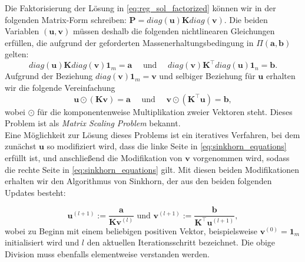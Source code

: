 \documentclass[twoside, 12pt,a4paper]{book}
\numberwithin{equation}{section}
\begin{document}
	\noindent Die Faktorisierung der Lösung in \eqref{eq:reg_sol_factorized} können wir in der folgenden Matrix-Form schreiben: $\boldsymbol{P} = diag(\boldsymbol{u}) \boldsymbol{K} diag(\boldsymbol{v})$. Die beiden Variablen $(\boldsymbol{u}, \boldsymbol{v})$ müssen deshalb die folgenden nichtlinearen Gleichungen erfüllen, die aufgrund der geforderten Massenerhaltungsbedingung in $\Pi (\boldsymbol{a},\boldsymbol{b})$ gelten:
		\begin{equation}
		diag(\boldsymbol{u}) \boldsymbol{K} diag(\boldsymbol{v})\boldsymbol{1}_m = \boldsymbol{a} \quad\text{ und } \quad
		diag(\boldsymbol{v}) \boldsymbol{K}^\top diag(\boldsymbol{u})\boldsymbol{1}_n = \boldsymbol{b}.
		\end{equation}
		Aufgrund der Beziehung $diag(\boldsymbol{v})\boldsymbol{1}_m =  \boldsymbol{v}$ und selbiger Beziehung für $\boldsymbol{u}$ erhalten wir die folgende Vereinfachung
		\begin{equation}
		\boldsymbol{u} \odot (\boldsymbol{K}\boldsymbol{v}) = \boldsymbol{a} \quad\text{ und }\quad
		\boldsymbol{v} \odot (\boldsymbol{K}^\top \boldsymbol{u}) = \boldsymbol{b}, \label{eq:sinkhorn_equations}
		\end{equation}  
		wobei $\odot$ für die komponentenweise Multiplikation zweier Vektoren steht. Dieses Problem ist als \textit{Matrix Scaling Problem} \cite{matrix_scaling} bekannt.\\
		
		\noindent Eine Möglichkeit zur Lösung dieses Problems ist ein iteratives Verfahren, bei dem zunächst $\boldsymbol{u}$ so modifiziert wird, dass die linke Seite in \eqref{eq:sinkhorn_equations} erfüllt ist, und anschließend die Modifikation von $\boldsymbol{v}$ vorgenommen wird, sodass die rechte Seite in \autoref{eq:sinkhorn_equations} gilt. Mit diesen beiden Modifikationen erhalten wir den Algorithmus von Sinkhorn, der aus den beiden folgenden Updates besteht:
		
		\begin{equation}
		\boldsymbol{u}^{(l+1)}:= \frac{\boldsymbol{a}}{\boldsymbol{K}\boldsymbol{v}^{(l)}} \text{ und }
		\boldsymbol{v}^{(l+1)}:= \frac{\boldsymbol{b}}{\boldsymbol{K}^\top \boldsymbol{u}^{(l+1)}}, \label{sinkhorn_iteartions}
		\end{equation} 
		wobei zu Beginn mit einem beliebigen positiven Vektor, beispielsweise ${\boldsymbol{v}^{(0)}=\boldsymbol{1}_m}$ initialisiert wird und $l$ den aktuellen Iterationsschritt bezeichnet. Die obige Division muss ebenfalls elementweise verstanden werden.
		
\end{document}
